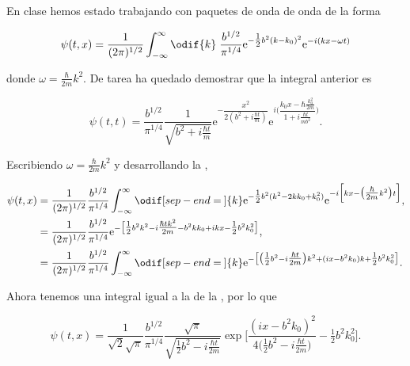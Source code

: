 \documentclass[../main.tex]{subfiles}
\begin{document}
\begin{problema}
	En clase hemos estado trabajando con paquetes de onda de onda
	de la forma

	\begin{equation}
		\psi(t, x) = \dfrac{1}{(2\pi)^{1/2}}\int_{-\infty}^{\infty}\odif{k}\; \dfrac{b^{1/2}}{\pi^{1/4}}\mathrm{e}^{-\tfrac{1}{2}b^{2}(k - k_{0})^{2}}\mathrm{e}^{-i(kx - \omega t)}
		\label{eq:wave-packet-1D}
	\end{equation}

	donde \(\omega = \tfrac{\hbar}{2m}k^{2}\). De tarea ha quedado demostrar
	que la integral anterior es

	\begin{equation*}
		\psi(t, t) = \dfrac{b^{1/2}}{\pi^{1/4}}\dfrac{1}{\sqrt{b^{2} + i\tfrac{\hbar t}{m}}}
		\mathrm{e}^{-\dfrac{x^{2}}{2(b^{2} + i\tfrac{\hbar t}{m})}}\mathrm{e}^{i \Biggl(\dfrac{k_{0}x - \hbar\tfrac{k_{0}^{2}}{2m}}{1 + i \tfrac{\hbar t}{mb^{2}}}\Biggr)}.
	\end{equation*}

	\startsolution

	Escribiendo \(\omega = \tfrac{\hbar}{2m}k^{2}\) y desarrollando la
	,

	\begin{align*}
		\psi(t, x) & = \dfrac{1}{(2\pi)^{1/2}}\dfrac{b^{1/2}}{\pi^{1/4}}
		\int_{-\infty}^{\infty}\odif[sep-end=\medspace]{k} \mathrm{e}^{-\tfrac{1}{2}b^{2}(k^{2} - 2kk_{0} + k_{0}^{2})}\mathrm{e}^{-i \Bigl[kx - \bigl(\tfrac{\hbar}{2m}k^{2}\bigr)t\Bigr]}, \\
		           & = \dfrac{1}{(2\pi)^{1/2}}\dfrac{b^{1/2}}{\pi^{1/4}}
		\mathrm{e}^{-\bigl[\tfrac{1}{2}b^{2}k^{2} - i\tfrac{\hbar tk^{2}}{2m} - b^{2}kk_{0} + ikx - \tfrac{1}{2}b^{2}k_{0}^{2}  \bigr]},                                                     \\
		           & = \dfrac{1}{(2\pi)^{1/2}}\dfrac{b^{1/2}}{\pi^{1/4}} \int_{-\infty}^{\infty}\odif[sep-end=\medspace]{k}
		\mathrm{e}^{-\bigl[\bigl(\tfrac{1}{2}b^{2} - i\tfrac{\hbar t}{2m}\bigr)k^{2}
		+ (ix - b^{2}k_{0})k + \tfrac{1}{2}b^{2}k_{0}^{2}\bigr]}.
	\end{align*}

	Ahora tenemos una integral igual a la de la ,
	por lo que

	\begin{equation*}
		\psi(t, x) = \dfrac{1}{\sqrt{2}\sqrt{\pi}}\dfrac{b^{1/2}}{\pi^{1/4}}\dfrac{\sqrt{\pi}}{\sqrt{\tfrac{1}{2}b^{2} - i\tfrac{\hbar t}{2m}}}
		\exp\Biggl[\dfrac{(ix - b^{2}k_{0})^{2}}{4 \bigl(\tfrac{1}{2}b^{2} - i\tfrac{\hbar t}{2m}\bigr)} - \tfrac{1}{2}b^{2}k_{0}^{2}\Biggr].
	\end{equation*}


\end{problema}
\end{document}
